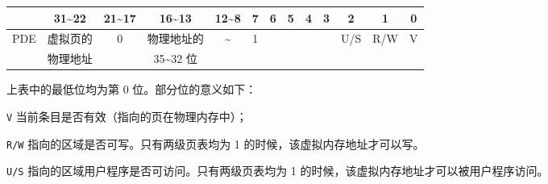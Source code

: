 \begin{problems}
\begin{table}[H]
\begin{tabular}{|c|c|c|c|c|c|c|c|c|c|c|c|c|}
                \hline
                & 31\textasciitilde 22 & 21\textasciitilde17 & 16\textasciitilde13 & 12\textasciitilde 8 & 7 & 6 & 5 & 4 & 3 & 2 & 1 & 0 \\ \hline
                \multirow{2}{*}{PDE} & 虚拟页的 & \multirow{2}{*}{0} & 物理地址的 & \multirow{2}{*}{\textasciitilde} & \multirow{2}{*}{1} & \multirow{2}{*}{} & \multirow{2}{*}{} & \multirow{2}{*}{} & \multirow{2}{*}{} & \multirow{2}{*}{U/S} & \multirow{2}{*}{R/W} & \multirow{2}{*}{V} \\
                & 物理地址 &  & 35\textasciitilde 32 位 &  &  &  &  &  &  &  &  &  \\ \hline
            \end{tabular}
        \end{table}

        上表中的最低位均为第 0 位。部分位的意义如下：
        \begin{asparadesc}
            \item[\texttt{V}] 当前条目是否有效（指向的页在物理内存中）；
            \item[\texttt{R/W}] 指向的区域是否可写。只有两级页表均为 1 的时候，该虚拟内存地址才可以写。
            \item[\texttt{U/S}] 指向的区域用户程序是否可访问。只有两级页表均为 1 的时候，该虚拟内存地址才可以被用户程序访问。
        \end{asparadesc}


\end{problems}
